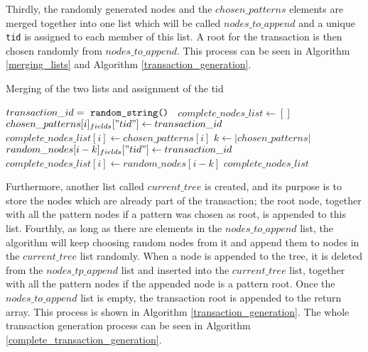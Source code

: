 \documentclass{acm_proc_article-sp-sigmod09}
\begin{document}
Thirdly, the randomly generated nodes and the $chosen\_patterns$ elements are merged together into one list which will be called $nodes\_to\_append$ and a unique \texttt{tid} is assigned to each member of this list. A root for the transaction is then chosen randomly from $nodes\_to\_append$. This process can be seen in Algorithm \ref{merging_lists} and Algorithm \ref{transaction_generation}.

\begin{algorithm}
\caption{Merging of the two lists and assignment of the tid}
\label{merging_lists}
\begin{algorithmic}[1]
\State $transaction\_id = \text{ \texttt{random\_string() }}$
\State $complete\_nodes\_list \gets []$
    \State $chosen\_patterns[i]_{fields}["tid"] \gets transaction\_id$
    \State $complete\_nodes\_list[i] \gets chosen\_patterns[i]$
\EndFor
\State $k \gets |chosen\_patterns|$
    \State $random\_nodes[i - k]_{fields}["tid"] \gets transaction\_id$
    \State $complete\_nodes\_list[i] \gets random\_nodes[i - k]$
\EndFor
\Return $complete\_nodes\_list$
\EndFunction
\end{algorithmic}
\end{algorithm}

Furthermore, another list called $current\_tree$ is created, and its purpose is to store the nodes which are already part of the transaction; the root node, together with all the pattern nodes if a pattern was chosen as root, is appended to this list.
Fourthly, as long as there are elements in the $nodes\_to\_append$ list, the algorithm will keep choosing random nodes from it and append them to nodes in the $current\_tree$ list randomly. When a node is appended to the tree, it is deleted from the $nodes\_tp\_append$ list and inserted into the $current\_tree$ list, together with all the pattern nodes if the appended node is a pattern root. Once the $nodes\_to\_append$ list is empty, the transaction root is appended to the return array. This process is shown in Algorithm \ref{transaction_generation}. The whole transaction generation process can be seen in Algorithm \ref{complete_transaction_generation}.
\end{document}
